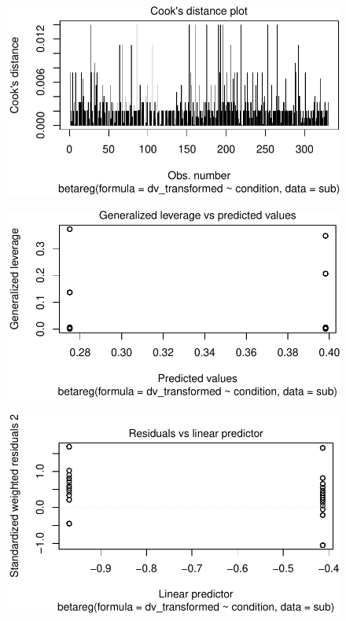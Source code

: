 \documentclass[
  letterpaper,
  DIV=11,
  numbers=noendperiod]{scrreprt}
\begin{document}
\begin{figure}[H]

{\centering \includegraphics{analysis/SGC3A/4_sgc3A_hypotesting_files/figure-pdf/unnamed-chunk-3-4.pdf}

}

\end{figure}

\begin{figure}[H]

{\centering \includegraphics{analysis/SGC3A/4_sgc3A_hypotesting_files/figure-pdf/unnamed-chunk-3-5.pdf}

}

\end{figure}

\begin{figure}[H]

{\centering \includegraphics{analysis/SGC3A/4_sgc3A_hypotesting_files/figure-pdf/unnamed-chunk-3-6.pdf}

}

\end{figure}
\end{document}
